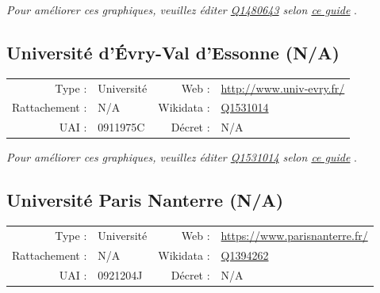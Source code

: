 \documentclass[12pt,french,landscape]{article}
\begin{document}
\textit{\scriptsize Pour améliorer ces graphiques, veuillez éditer \href{https://www.wikidata.org/entity/Q1480643}{Q1480643}  selon \href{https://github.com/cpesr/wikidataESR/blob/master/Rmd/wikidataESR.md}{ce guide}}
.


\newpage

\hypertarget{universituxe9-duxe9vry-val-dessonne-na}{%
\subsection{Université d'Évry-Val d'Essonne
(N/A)}\label{universituxe9-duxe9vry-val-dessonne-na}}

\begin{tabular*}{0.45\textwidth}{rp{2cm}rl}  
\hline  
Type : & Université & Web : &\href{http://www.univ-evry.fr/}{http://www.univ-evry.fr/} \\  
Rattachement : & N/A & Wikidata : & \href{https://www.wikidata.org/entity/Q1531014}{Q1531014} \\  
UAI : & 0911975C & Décret : & N/A \\  
\hline  
\end{tabular*}

\textit{\scriptsize Pour améliorer ces graphiques, veuillez éditer \href{https://www.wikidata.org/entity/Q1531014}{Q1531014}  selon \href{https://github.com/cpesr/wikidataESR/blob/master/Rmd/wikidataESR.md}{ce guide}}
.


\newpage

\hypertarget{universituxe9-paris-nanterre-na}{%
\subsection{Université Paris Nanterre
(N/A)}\label{universituxe9-paris-nanterre-na}}

\begin{tabular*}{0.45\textwidth}{rp{2cm}rl}  
\hline  
Type : & Université & Web : &\href{https://www.parisnanterre.fr/}{https://www.parisnanterre.fr/} \\  
Rattachement : & N/A & Wikidata : & \href{https://www.wikidata.org/entity/Q1394262}{Q1394262} \\  
UAI : & 0921204J & Décret : & N/A \\  
\hline  
\end{tabular*}
\end{document}
